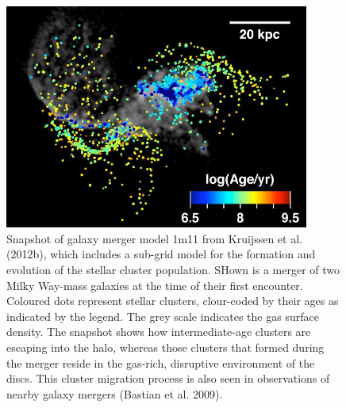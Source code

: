 \begin{figure}[H]
\centering
\includegraphics[width=10cm]{images/merger.png}
\caption[Galaxy merger model 1m11 from Kruijssen et al. (2012b)]{Snapshot of galaxy merger model 1m11 from Kruijssen et al. (2012b), which includes a sub-grid model for the formation and evolution of the stellar cluster population. SHown is a merger of two Milky Way-mass galaxies at the time of their first encounter. Coloured dots represent stellar clusters, clour-coded by their ages as indicated by the legend. The grey scale indicates the gas surface density. The snapshot shows how intermediate-age clusters are escaping into the halo, whereas those clusters that formed during the merger reside in the gas-rich, disruptive environment of the discs. This cluster migration process is also seen in observations of nearby galaxy mergers (Bastian et al. 2009).}
\end{figure}